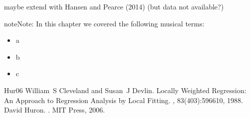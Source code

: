 \documentclass[letterpaper,10pt,english]{sphinxmanual}
\begin{document}
maybe extend with Hansen and Pearce (2014) (but data not available?)

\begin{sphinxadmonition}{note}{Note:}
In this chapter we covered the following musical terms:
\begin{itemize}
\item {} 
a

\item {} 
b

\item {} 
c

\end{itemize}
\end{sphinxadmonition}



\begin{sphinxthebibliography}{Hur06}
William S Cleveland and Susan J Devlin. Locally Weighted Regression: An Approach to Regression Analysis by Local Fitting. , 83(403):596\textendash{}610, 1988.
David Huron. . MIT Press, 2006.
\end{sphinxthebibliography}



\renewcommand{\indexname}{Index}
\printindex
\end{document}
